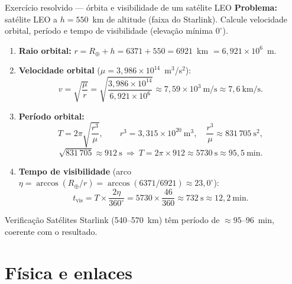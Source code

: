 \documentclass[aspectratio=169,11pt]{beamer}
\begin{document}
\begin{frame}{Exercício resolvido --- órbita e visibilidade de um satélite LEO}
  \textbf{Problema:} satélite LEO a $h = 550$~km de altitude (faixa do Starlink). Calcule velocidade orbital, período e tempo de visibilidade (elevação mínima $0^\circ$).
  \begin{enumerate}
    \item \textbf{Raio orbital:} $r = R_{\oplus} + h = 6371 + 550 = 6921$~km $= 6{,}921 \times 10^6$~m.
    \item \textbf{Velocidade orbital} ($\mu = 3{,}986 \times 10^{14}$~m$^3$/s$^2$):
      $$v = \sqrt{\dfrac{\mu}{r}} = \sqrt{\dfrac{3{,}986 \times 10^{14}}{6{,}921 \times 10^6}} \approx 7{,}59 \times 10^3\ \text{m/s} \approx 7{,}6\ \text{km/s}.$$
    \item \textbf{Período orbital:}
      $$T = 2\pi\sqrt{\dfrac{r^3}{\mu}},\qquad r^3 = 3{,}315 \times 10^{20}\ \text{m}^3,\quad \dfrac{r^3}{\mu} \approx 831\,705\ \text{s}^2,$$
      $$\sqrt{831\,705} \approx 912\ \text{s}\ \Rightarrow\ T = 2\pi \times 912 \approx 5730\ \text{s} \approx 95{,}5\ \text{min}.$$
    \item \textbf{Tempo de visibilidade} (arco $\eta = \arccos(R_{\oplus}/r) = \arccos(6371/6921) \approx 23{,}0^\circ$):
      $$t_{\text{vis}} = T \times \dfrac{2\eta}{360^\circ} = 5730 \times \dfrac{46}{360} \approx 732\ \text{s} \approx 12{,}2\ \text{min}.$$
  \end{enumerate}
  \begin{block}{Verificação}
    Satélites Starlink (540--570~km) têm período de $\approx 95$--$96$~min, coerente com o resultado.
  \end{block}
\end{frame}

\section{Física e enlaces}
\end{document}
